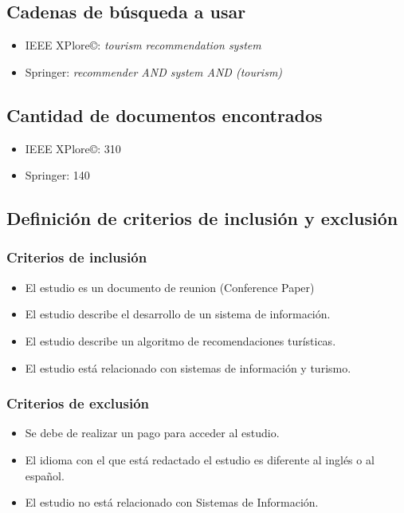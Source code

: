 \documentclass{report}
\begin{document}
\subsection{Cadenas de búsqueda a usar}

\begin{itemize}
    \item{IEEE XPlore\copyright{}: \emph{tourism recommendation system}}
    \item{Springer: \emph{recommender AND system AND (tourism)}}
\end{itemize}

\subsection{Cantidad de documentos encontrados}

\begin{itemize}
    \item{IEEE XPlore\copyright{}: 310}
    \item{Springer: 140}
\end{itemize}

\subsection{Definición de criterios de inclusión y exclusión}

\subsubsection{Criterios de inclusión}

\begin{itemize}
    \item{El estudio es un documento de reunion (Conference Paper)}
    \item{El estudio describe el desarrollo de un sistema de información.}
    \item{El estudio describe un algoritmo de recomendaciones turísticas.}
    \item{El estudio está relacionado con sistemas de información y turismo.}
\end{itemize}

\subsubsection{Criterios de exclusión}

\begin{itemize}
    \item{Se debe de realizar un pago para acceder al estudio.}
    \item{El idioma con el que está redactado el estudio es diferente al inglés
        o al español.}
    \item{El estudio no está relacionado con Sistemas de Información.}
\end{itemize}
\end{document}
